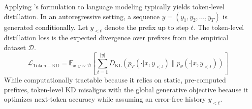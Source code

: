 \documentclass{article} %
\newcommand{\KL}{D_{\mathrm{KL}}}
\newcommand{\ptheta}{p_\theta}
\newcommand{\pteacher}{p_T}
\newcommand{\loss}{\mathcal{L}}
\begin{document}
Applying \citet{hinton2015distilling}'s formulation to language modeling typically yields token-level distillation. In an autoregressive setting, a sequence $y = (y_1, y_2, \dots, y_T)$ is generated conditionally. Let $y_{<t}$ denote the prefix up to step $t$. The token-level distillation loss is the expected divergence over prefixes from the empirical dataset $\mathcal{D}$.
\begin{equation}
    \loss_{\mathrm{Token-KD}} = \mathbb{E}_{x, y \sim \mathcal{D}} \left[ \sum_{t=1}^{|y|} \KL(\pteacher(\cdot | x, y_{<t}) \parallel \ptheta(\cdot | x, y_{<t})) \right]
\end{equation}
While computationally tractable because it relies on static, pre-computed prefixes, token-level KD misaligns with the global generative objective because it optimizes next-token accuracy while assuming an error-free history $y_{<t}$.
\end{document}
